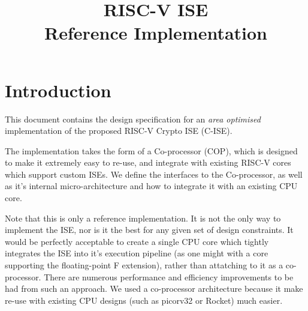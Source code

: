 \documentclass{article}
\title{RISC-V \ISE ISE \\ Reference Implementation}
\begin{document}
\maketitle \tableofcontents




\newcommand{\SIGNALS}[3]{
\begin{table}[H]
\begin{tabularx}{\textwidth}{@{} c c l Y @{}}
\toprule
\textbf{I/O} & \textbf{Size} & \textbf{Name} & \textbf{Description} \\
\midrule
#1
\bottomrule
\end{tabularx}
\caption{#2}
\label{#3}
\end{table}
}

\newcommand{\SIGREF}[1]{{\tt #1}}

\newcommand{\SIGNALI}[3]{
    {\bf I} & $#1$ &{\tt #2}& #3 \\ \addlinespace
}

\newcommand{\SIGNALO}[3]{
    {\bf O} & $#1$ &{\tt #2}& #3 \\ \addlinespace
}

\newcommand{\cpucopif}{\nameref{sec:cpu-cop-if} }


\section{Introduction}

This document contains the design specification for an {\em area optimised}
implementation of the proposed RISC-V Crypto ISE (C-ISE).

The implementation takes the form of a Co-processor (COP), which is designed
to make it extremely easy to re-use, and integrate with existing RISC-V cores
which support custom ISEs. We define the interfaces to the Co-processor, as
well as it's internal micro-architecture and how to integrate it with an
existing CPU core.

Note that this is only a reference implementation. It is not the only way
to implement the ISE, nor is it the best for any given set of design
constraints. It would be perfectly acceptable to create a single CPU core
which tightly integrates the ISE into it's execution pipeline (as one might
with a core supporting the floating-point F extension), rather than
attatching to it as a co-processor. There are numerous performance and
efficiency improvements to be had from such an approach. We used a
co-processor architecture because it make re-use with existing CPU designs
(such as picorv32 or Rocket) much easier.
\end{document}
